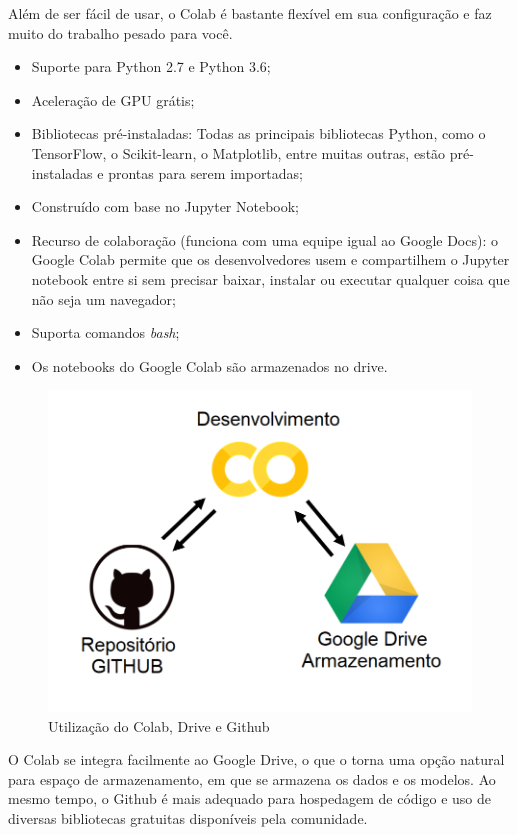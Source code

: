 Além de ser fácil de usar, o Colab é bastante flexível em sua configuração e faz muito do trabalho pesado para você. \cite{colabdetail}

\begin{itemize}
    \item Suporte para Python 2.7 e Python 3.6;
    \item Aceleração de GPU grátis;
    \item Bibliotecas pré-instaladas: Todas as principais bibliotecas Python, como o TensorFlow, o Scikit-learn, o Matplotlib, entre muitas outras, estão pré-instaladas e prontas para serem importadas;
    \item Construído com base no Jupyter Notebook;
    \item Recurso de colaboração (funciona com uma equipe igual ao Google Docs): o Google Colab permite que os desenvolvedores usem e compartilhem o Jupyter notebook entre si sem precisar baixar, instalar ou executar qualquer coisa que não seja um navegador;
    \item Suporta comandos \textit{bash};
    \item Os notebooks do Google Colab são armazenados no drive.
\end{itemize}

\begin{figure}[htbp]
		\centering
		\includegraphics[scale=0.4]{figuras/MachineLearning/colabGithub.png}
		\caption{Utilização do Colab, Drive e Github}
		\label{fig:colabGithub}
\end{figure}

O Colab se integra facilmente ao Google Drive, o que o torna uma opção natural para espaço de armazenamento, em que se armazena os dados e os modelos. Ao mesmo tempo, o Github é mais adequado para hospedagem de código e uso de diversas  bibliotecas gratuitas disponíveis pela comunidade. 


